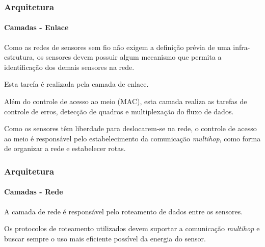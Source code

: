 \documentclass[notes]{beamer}
\begin{document}
\begin{frame}
\label{slide_40}
\frametitle{Arquitetura}
\framesubtitle{Camadas - Enlace}

\begin{block}

Como as redes de sensores sem fio não exigem a definição prévia de uma infra-estrutura, os sensores devem possuir algum mecanismo que permita a identificação dos demais sensores na rede. 
\end{block} \pause

\begin{block}

Esta tarefa é realizada pela camada de enlace.

\end{block} \pause

\begin{block}

Além do controle de acesso ao meio (MAC), esta camada realiza as tarefas de controle de erros, detecção de quadros e multiplexação do fluxo de dados.

\end{block} \pause

\begin{block}

Como os sensores têm liberdade para deslocarem-se na rede, o controle de acesso ao meio é responsável pelo estabelecimento da comunicação \textit{multihop}, como forma de organizar a rede e estabelecer rotas.

\end{block}

\end{frame}

\begin{frame}
\label{slide_41}
\frametitle{Arquitetura}
\framesubtitle{Camadas - Rede}

\begin{block}

A camada de rede é responsável pelo roteamento de dados entre os sensores. 

\end{block} \pause

\begin{alertblock}

Os protocolos de roteamento utilizados devem suportar a comunicação \textit{multihop} e buscar sempre o uso mais eficiente possível da energia do sensor.

\end{alertblock}

\end{frame}
\end{document}
